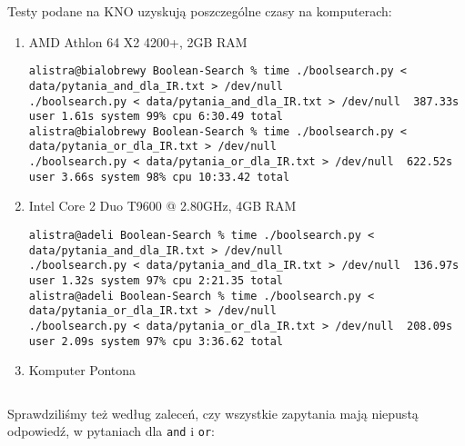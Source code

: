 \documentclass[11pt]{article}
\begin{document}
Testy podane na KNO uzyskują poszczególne czasy na komputerach:
\begin{enumerate}
\item AMD Athlon 64 X2 4200+, 2GB RAM
\begin{verbatim}
alistra@bialobrewy Boolean-Search % time ./boolsearch.py < data/pytania_and_dla_IR.txt > /dev/null
./boolsearch.py < data/pytania_and_dla_IR.txt > /dev/null  387.33s user 1.61s system 99% cpu 6:30.49 total
alistra@bialobrewy Boolean-Search % time ./boolsearch.py < data/pytania_or_dla_IR.txt > /dev/null
./boolsearch.py < data/pytania_or_dla_IR.txt > /dev/null  622.52s user 3.66s system 98% cpu 10:33.42 total
\end{verbatim}
\item Intel Core 2 Duo T9600 @ 2.80GHz, 4GB RAM
\begin{verbatim}
alistra@adeli Boolean-Search % time ./boolsearch.py < data/pytania_and_dla_IR.txt > /dev/null
./boolsearch.py < data/pytania_and_dla_IR.txt > /dev/null  136.97s user 1.32s system 97% cpu 2:21.35 total
alistra@adeli Boolean-Search % time ./boolsearch.py < data/pytania_or_dla_IR.txt > /dev/null
./boolsearch.py < data/pytania_or_dla_IR.txt > /dev/null  208.09s user 2.09s system 97% cpu 3:36.62 total
\end{verbatim}
\item Komputer Pontona
\begin{verbatim}
\end{verbatim}
\end{enumerate}

Sprawdziliśmy też według zaleceń, czy wszystkie zapytania mają niepustą odpowiedź, w pytaniach dla \texttt{and} i \texttt{or}:
\begin{verbatim}
\end{verbatim}
\end{document}
